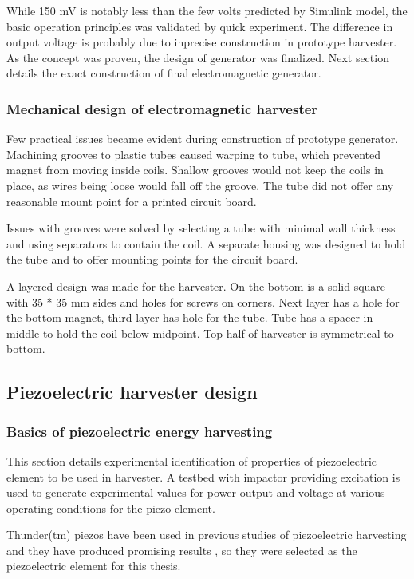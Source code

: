 While 150 mV is notably less than the few volts predicted by Simulink model, the basic operation principles was validated by quick experiment. The difference in output voltage is probably due to inprecise construction in prototype harvester. As the concept was proven, the design of generator was finalized. Next section details the exact construction of final electromagnetic generator. 

\subsubsection{Mechanical design of electromagnetic harvester}\label{sect:emh_design}
Few practical issues became evident during construction of prototype generator. Machining grooves to plastic tubes caused warping to tube, which prevented magnet from moving inside coils. Shallow grooves would not keep the coils in place, as wires being loose would fall off the groove. The tube did not offer any reasonable mount point for a printed circuit board. 

Issues with grooves were solved by selecting a tube with minimal wall thickness and using separators to contain the coil. A separate housing was designed to hold the tube and to offer mounting points for the circuit board. 

A layered design was made for the harvester. On the bottom is a solid square with 35 * 35 mm sides and holes for screws on corners. Next layer has a hole for the bottom magnet, third layer has hole for the tube. Tube has a spacer in middle to hold the coil below midpoint. Top half of harvester is symmetrical to bottom. 

\subsection{Piezoelectric harvester design}
\subsubsection{Basics of piezoelectric energy harvesting }
This section details experimental identification of properties of piezoelectric element to be used in harvester. A testbed with impactor providing excitation is used to generate experimental values for power output and voltage at various operating conditions for the piezo element.

Thunder(tm) piezos have been used in previous studies of piezoelectric harvesting and they have produced promising results \cite{Manla2009}, so they were selected as the piezoelectric element for this thesis.

